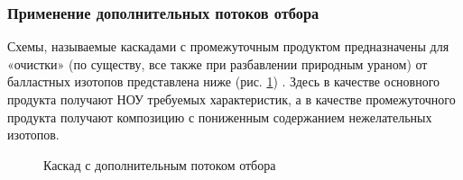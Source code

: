 \subsubsection{Применение дополнительных потоков отбора}
Схемы, называемые каскадами с промежуточным продуктом предназначены для «очистки» (по существу, все также при разбавлении природным ураном) от балластных изотопов представлена ниже (рис. \ref{fig:3_out}) \cite{palkinAnaliticheskiyRaschetSoderzhaniya2007}. Здесь в качестве основного продукта получают НОУ требуемых характеристик, а в качестве промежуточного продукта получают композицию с пониженным содержанием нежелательных изотопов.
\begin{figure}[ht]
  \caption{Каскад с дополнительным потоком отбора}\label{fig:3_out}
\end{figure}


